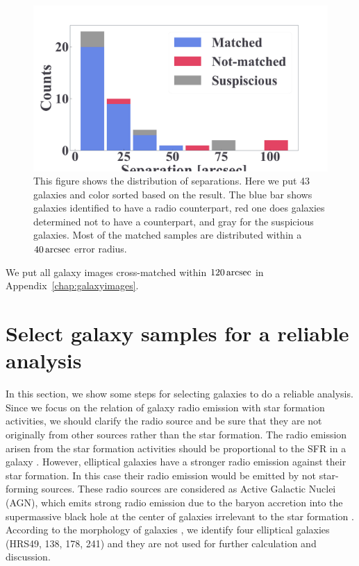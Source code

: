 \begin{figure}[htbp]
	\centering
	\includegraphics[width=.8\linewidth]{Chapter_4/Figures/Method_separation.pdf}
    \caption[Separation from the cross-matching]{\label{fig:separation}
        This figure shows the distribution of separations.
        Here we put 43 galaxies and color sorted based on the result.
        The blue bar shows galaxies identified to have a radio counterpart, red one does galaxies determined not to have a counterpart, and gray for the suspicious galaxies.
        Most of the matched samples are distributed within a $40\,\mathrm{arcsec}$ error radius.
    }
\end{figure}

We put all galaxy images cross-matched within $120\,\mathrm{arcsec}$ in Appendix~\ref{chap:galaxyimages}.



\section{Select galaxy samples for a reliable analysis}\label{sec:reducegalaxysamples}

In this section, we show some steps for selecting galaxies to do a reliable analysis.
Since we focus on the relation of galaxy radio emission with star formation activities, we should clarify the radio source and be sure that they are not originally from other sources rather than the star formation.
The radio emission arisen from the star formation activities should be proportional to the SFR in a galaxy \citep{Condon1992a, Murphy2011}.
However, elliptical galaxies have a stronger radio emission against their star formation.
In this case their radio emission would be emitted by not star-forming sources.
These radio sources are considered as Active Galactic Nuclei (AGN), which emits strong radio emission due to the baryon accretion into the supermassive black hole at the center of galaxies irrelevant to the star formation \citep[e.g.,][]{Urry1995, Padovani2017}.
According to the morphology of galaxies \citep{Cortese2012}, we identify four elliptical galaxies (HRS49, 138, 178, 241) and they are not used for further calculation and discussion.


